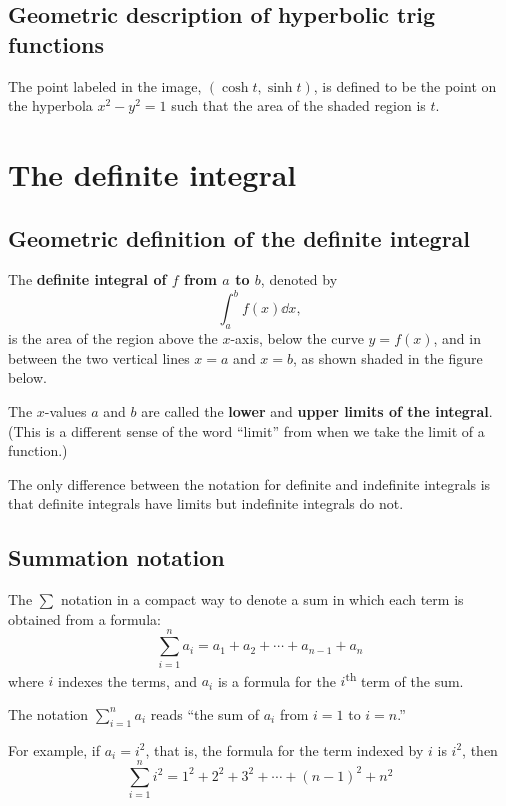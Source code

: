 \subsection{Geometric description of hyperbolic trig functions}
The point labeled in the image, $(\cosh t, \sinh t)$, is defined to be the point on the hyperbola $x^2-y^2=1$ such that the area of the shaded region is $t$.
\section{The definite integral}
\subsection{Geometric definition of the definite integral}
The \textbf{definite integral of $f$ from $a$ to $b$}, denoted by
\[\int_a^bf(x)\dd x,\]
is the area of the region above the $x$-axis, below the curve $y=f(x)$, and in between the two vertical lines $x=a$ and $x=b$, as shown shaded in the figure below.

The $x$-values $a$ and $b$ are called the \textbf{lower} and \textbf{upper limits of the integral}. (This is a different sense of the word ``limit'' from when we take the limit of a function.)

The only difference between the notation for definite and indefinite integrals is that definite integrals have limits but indefinite integrals do not.
\subsection{Summation notation}
The $\sum$ notation in a compact way to denote a sum in which each term is obtained from a formula:
\[\sum_{i=1}^na_i=a_1+a_2+\cdots+a_{n-1}+a_n\]
where $i$ indexes the terms, and $a_i$ is a formula for the $i$\textsuperscript{th} term of the sum.

The notation $\sum_{i=1}^na_i$ reads ``the sum of $a_i$ from $i=1$ to $i=n$.''

For example, if $a_i=i^2$, that is, the formula for the term indexed by $i$ is $i^2$, then
\[\sum_{i=1}^ni^2=1^2+2^2+3^2+\cdots+(n-1)^2+n^2\]
